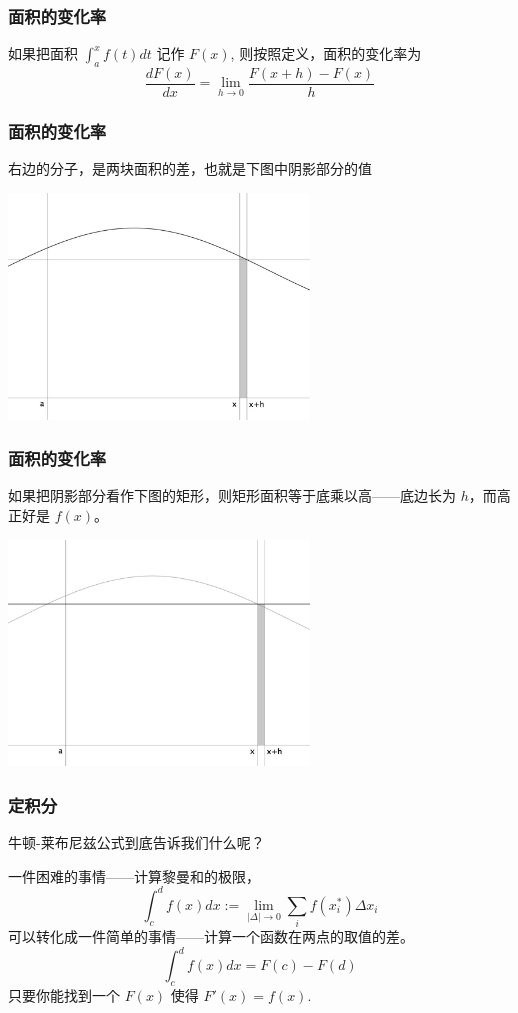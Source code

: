 \documentclass[CJK]{beamer}
\begin{document}
\begin{frame}
\frametitle{面积的变化率}
如果把面积 $\displaystyle\int_a^x f(t)dt$ 记作 $F(x)$, 则\alert{按照定义}，面积的变化率为
\[
	\dfrac{dF(x)}{dx} = \lim_{h\to 0}\dfrac{F(x+h) - F(x)}{h}
\]
\end{frame}

\begin{frame}
\frametitle{面积的变化率}
右边的分子，是两块面积的差，也就是下图中阴影部分的值
\begin{center}
\includegraphics[height=6cm]{graph4.jpeg}
\end{center}
\end{frame}

\begin{frame}
\frametitle{面积的变化率}
如果把阴影部分看作下图的\alert{矩形}，则矩形面积等于底乘以高——底边长为 $h$，而高正好是 $f(x)$。
\begin{center}
\includegraphics[height=6cm]{graph5.jpeg}
\end{center}
\end{frame}

\begin{frame}
\frametitle{定积分}
牛顿-莱布尼兹公式到底告诉我们什么呢？

一件困难的事情——计算\alert{黎曼和的极限}，
\[
	\int_c^d f(x)dx := \lim_{|\Delta|\to 0}\sum_i f(x_i^*)\Delta x_i
\]
可以转化成一件简单的事情——计算\alert{一个函数在两点的取值的差}。
\[
	\int_c^d f(x)dx = F(c) - F(d)
\]
只要你能\alert{找到}一个 $F(x)$ 使得 $F'(x) = f(x)$.
\end{frame}
\end{document}
